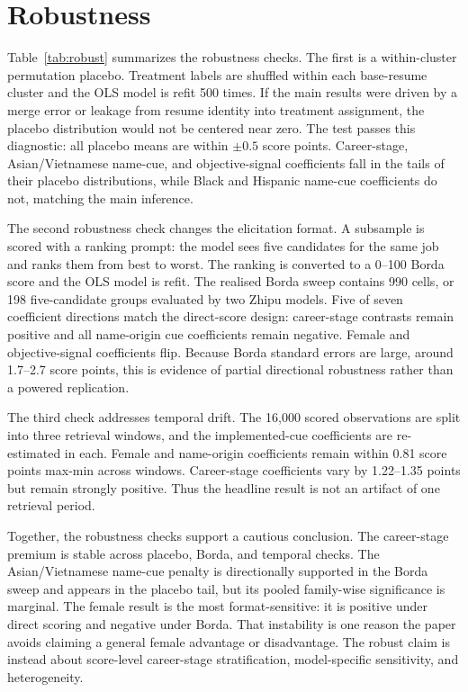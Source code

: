 \documentclass[10pt,twocolumn,letterpaper]{article}
\begin{document}
\section{Robustness}

Table~\ref{tab:robust} summarizes the robustness checks. The first is a within-cluster permutation placebo. Treatment labels are shuffled within each base-resume cluster and the OLS model is refit 500 times. If the main results were driven by a merge error or leakage from resume identity into treatment assignment, the placebo distribution would not be centered near zero. The test passes this diagnostic: all placebo means are within $\pm 0.5$ score points. Career-stage, Asian/Vietnamese name-cue, and objective-signal coefficients fall in the tails of their placebo distributions, while Black and Hispanic name-cue coefficients do not, matching the main inference.

The second robustness check changes the elicitation format. A subsample is scored with a ranking prompt: the model sees five candidates for the same job and ranks them from best to worst. The ranking is converted to a 0--100 Borda score and the OLS model is refit. The realised Borda sweep contains 990 cells, or 198 five-candidate groups evaluated by two Zhipu models. Five of seven coefficient directions match the direct-score design: career-stage contrasts remain positive and all name-origin cue coefficients remain negative. Female and objective-signal coefficients flip. Because Borda standard errors are large, around 1.7--2.7 score points, this is evidence of partial directional robustness rather than a powered replication.

The third check addresses temporal drift. The 16,000 scored observations are split into three retrieval windows, and the implemented-cue coefficients are re-estimated in each. Female and name-origin coefficients remain within 0.81 score points max-min across windows. Career-stage coefficients vary by 1.22--1.35 points but remain strongly positive. Thus the headline result is not an artifact of one retrieval period.

Together, the robustness checks support a cautious conclusion. The career-stage premium is stable across placebo, Borda, and temporal checks. The Asian/Vietnamese name-cue penalty is directionally supported in the Borda sweep and appears in the placebo tail, but its pooled family-wise significance is marginal. The female result is the most format-sensitive: it is positive under direct scoring and negative under Borda. That instability is one reason the paper avoids claiming a general female advantage or disadvantage. The robust claim is instead about score-level career-stage stratification, model-specific sensitivity, and heterogeneity.
\end{document}
